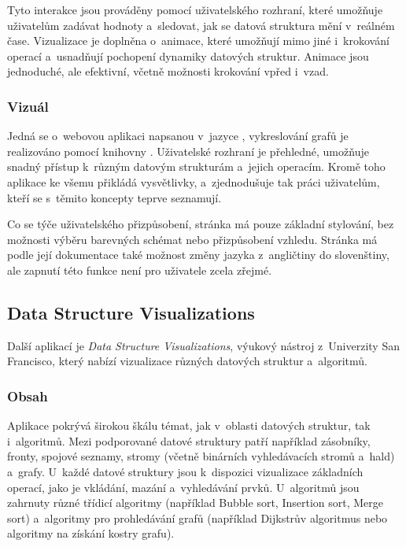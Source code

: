 Tyto interakce jsou prováděny pomocí uživatelského rozhraní, které umožňuje uživatelům zadávat hodnoty a~sledovat, jak se datová struktura mění v~reálném čase.
Vizualizace je doplněna o~animace, které umožňují mimo jiné i~krokování operací a~usnadňují pochopení dynamiky datových struktur.
Animace jsou jednoduché, ale efektivní, včetně možnosti krokování vpřed i~vzad.

\subsubsection*{Vizuál}

Jedná se o~webovou aplikaci napsanou v~jazyce , vykreslování grafů je realizováno pomocí knihovny .
Uživatelské rozhraní je přehledné, umožňuje snadný přístup k~různým datovým strukturám a~jejich operacím.
Kromě toho aplikace ke všemu přikládá vysvětlivky, a~zjednodušuje tak práci uživatelům, kteří se s~těmito koncepty teprve seznamují.

Co se týče uživatelského přizpůsobení, stránka má pouze základní stylování, bez možnosti výběru barevných schémat nebo přizpůsobení vzhledu.
Stránka má podle její dokumentace také možnost změny jazyka z~angličtiny do slovenštiny, ale zapnutí této funkce není pro uživatele zcela zřejmé.

\subsection{Data Structure Visualizations}
\label{subsec:other_apps_ds_data_structure_visualizations}

Další aplikací je \textit{Data Structure Visualizations}, výukový nástroj z~Univerzity San Francisco, který nabízí vizualizace různých datových struktur a~algoritmů.~\cite{dataStructureVisualization}

\subsubsection*{Obsah}

Aplikace pokrývá širokou škálu témat, jak v~oblasti datových struktur, tak i~algoritmů.
Mezi podporované datové struktury patří například zásobníky, fronty, spojové seznamy, stromy (včetně binárních vyhledávacích stromů a~hald) a~grafy.
U~každé datové struktury jsou k~dispozici vizualizace základních operací, jako je vkládání, mazání a~vyhledávání prvků.
U~algoritmů jsou zahrnuty různé třídicí algoritmy (například Bubble sort, Insertion sort, Merge sort) a~algoritmy pro prohledávání grafů (například Dijkstrův algoritmus nebo algoritmy na získání kostry grafu).

